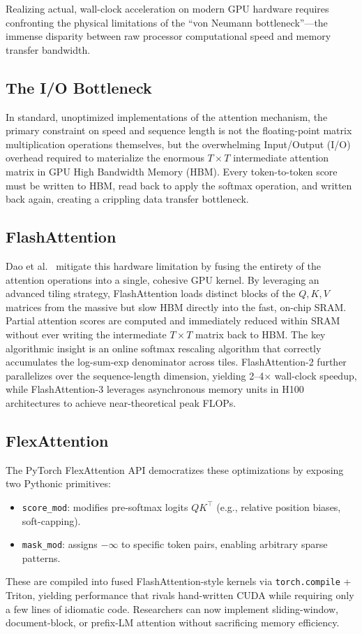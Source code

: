 \documentclass[11pt]{article}
\begin{document}
Realizing actual, wall-clock acceleration on modern GPU hardware requires confronting the physical limitations of the ``von Neumann bottleneck''—the immense disparity between raw processor computational speed and memory transfer bandwidth.

\subsection{The I/O Bottleneck}

In standard, unoptimized implementations of the attention mechanism, the primary constraint on speed and sequence length is not the floating-point matrix multiplication operations themselves, but the overwhelming Input/Output (I/O) overhead required to materialize the enormous $T \times T$ intermediate attention matrix in GPU High Bandwidth Memory (HBM). Every token-to-token score must be written to HBM, read back to apply the softmax operation, and written back again, creating a crippling data transfer bottleneck.

\subsection{FlashAttention}

Dao et al.~\cite{dao2022flashattention} mitigate this hardware limitation by fusing the entirety of the attention operations into a single, cohesive GPU kernel. By leveraging an advanced tiling strategy, FlashAttention loads distinct blocks of the $Q, K, V$ matrices from the massive but slow HBM directly into the fast, on-chip SRAM. Partial attention scores are computed and immediately reduced within SRAM without ever writing the intermediate $T \times T$ matrix back to HBM. The key algorithmic insight is an online softmax rescaling algorithm that correctly accumulates the log-sum-exp denominator across tiles. FlashAttention-2 further parallelizes over the sequence-length dimension, yielding 2--4$\times$ wall-clock speedup, while FlashAttention-3 leverages asynchronous memory units in H100 architectures to achieve near-theoretical peak FLOPs.

\subsection{FlexAttention}

The PyTorch FlexAttention API democratizes these optimizations by exposing two Pythonic primitives:
\begin{itemize}
  \item \texttt{score\_mod}: modifies pre-softmax logits $QK^\top$ (e.g., relative position biases, soft-capping).
  \item \texttt{mask\_mod}: assigns $-\infty$ to specific token pairs, enabling arbitrary sparse patterns.
\end{itemize}
These are compiled into fused FlashAttention-style kernels via \texttt{torch.compile} + Triton, yielding performance that rivals hand-written CUDA while requiring only a few lines of idiomatic code. Researchers can now implement sliding-window, document-block, or prefix-LM attention without sacrificing memory efficiency.
\end{document}
